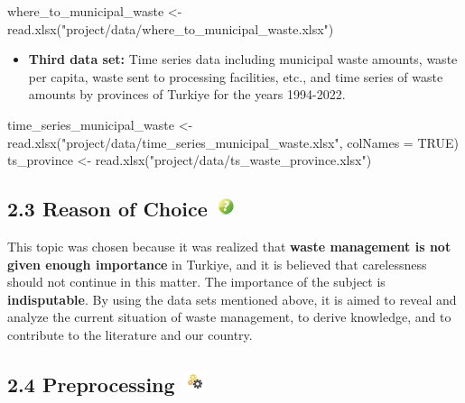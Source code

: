 \documentclass[
  11pt,
  a4paper,
  DIV=11,
  numbers=noendperiod]{scrartcl}
\newenvironment{Shaded}{\begin{snugshade}}{\end{snugshade}}
\newcommand{\AttributeTok}[1]{\textcolor[rgb]{0.40,0.45,0.13}{#1}}
\newcommand{\ConstantTok}[1]{\textcolor[rgb]{0.56,0.35,0.01}{#1}}
\newcommand{\FunctionTok}[1]{\textcolor[rgb]{0.28,0.35,0.67}{#1}}
\newcommand{\NormalTok}[1]{\textcolor[rgb]{0.00,0.23,0.31}{#1}}
\newcommand{\OtherTok}[1]{\textcolor[rgb]{0.00,0.23,0.31}{#1}}
\newcommand{\StringTok}[1]{\textcolor[rgb]{0.13,0.47,0.30}{#1}}
\providecommand{\tightlist}{%
  \setlength{\itemsep}{0pt}\setlength{\parskip}{0pt}}\usepackage{longtable,booktabs,array}
\begin{document}
\begin{Shaded}
\begin{Highlighting}[]
\NormalTok{where\_to\_municipal\_waste }\OtherTok{\textless{}{-}} \FunctionTok{read.xlsx}\NormalTok{(}\StringTok{"project/data/where\_to\_municipal\_waste.xlsx"}\NormalTok{)}
\end{Highlighting}
\end{Shaded}

\begin{itemize}
\tightlist
\item
  \textbf{Third data set:} Time series data including municipal waste
  amounts, waste per capita, waste sent to processing facilities, etc.,
  and time series of waste amounts by provinces of Turkiye for the years
  1994-2022.
\end{itemize}

\begin{Shaded}
\begin{Highlighting}[]
\NormalTok{time\_series\_municipal\_waste }\OtherTok{\textless{}{-}} \FunctionTok{read.xlsx}\NormalTok{(}\StringTok{"project/data/time\_series\_municipal\_waste.xlsx"}\NormalTok{, }\AttributeTok{colNames =} \ConstantTok{TRUE}\NormalTok{)}
\NormalTok{ts\_province }\OtherTok{\textless{}{-}} \FunctionTok{read.xlsx}\NormalTok{(}\StringTok{"project/data/ts\_waste\_province.xlsx"}\NormalTok{)}
\end{Highlighting}
\end{Shaded}

\subsection[{2.3 Reason of Choice} ]{\texorpdfstring{{2.3 Reason of
Choice}
\protect\includegraphics[width=0.26042in,height=0.21875in]{assets/images/reason.jpg}}{2.3 Reason of Choice }}\label{reason-of-choice}

This topic was chosen because it was realized that \textbf{waste
management is not given enough importance} in Turkiye, and it is
believed that carelessness should not continue in this matter. The
importance of the subject is \textbf{indisputable}. By using the data
sets mentioned above, it is aimed to reveal and analyze the current
situation of waste management, to derive knowledge, and to contribute to
the literature and our country.

\subsection[{2.4 Preprocessing} ]{\texorpdfstring{{2.4 Preprocessing}
\protect\includegraphics[width=0.30208in,height=0.25in]{assets/images/preprocess.jpg}}{2.4 Preprocessing }}\label{preprocessing}
\end{document}
